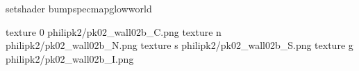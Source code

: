 setshader bumpspecmapglowworld


texture 0 philipk2/pk02_wall02b_C.png
texture n philipk2/pk02_wall02b_N.png
texture s philipk2/pk02_wall02b_S.png
texture g philipk2/pk02_wall02b_I.png

